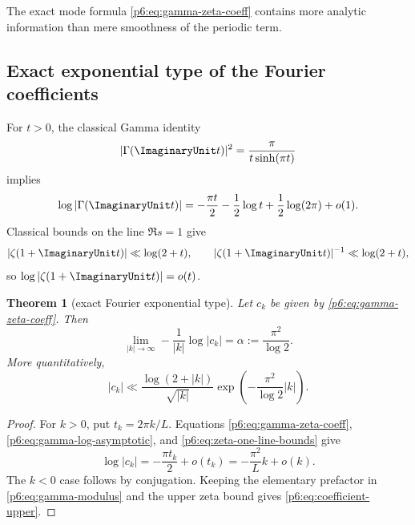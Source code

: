 \documentclass[11pt]{article}
\numberwithin{equation}{section}
\newtheorem{theorem}{Theorem}[section]
\theoremstyle{definition}
\theoremstyle{remark}
\begin{document}
The exact mode formula \eqref{p6:eq:gamma-zeta-coeff} contains more analytic information than
mere smoothness of the periodic term.

\subsection{Exact exponential type of the Fourier coefficients}

For $t>0$, the classical Gamma identity \cite{p6:dlmf}
\begin{equation}
 |\Gamma(\ImaginaryUnit t)|^2=\frac{\pi}{t\sinh(\pi t)}
 \label{p6:eq:gamma-modulus}
\end{equation}
implies
\begin{equation}
 \log|\Gamma(\ImaginaryUnit t)|
 =-\frac{\pi t}{2}-\frac12\log t+\frac12\log(2\pi)+o(1).
 \label{p6:eq:gamma-log-asymptotic}
\end{equation}
Classical bounds on the line $\Re s=1$ \cite{p6:titchmarsh,p6:trudgian2014,p6:trudgian2015} give
\begin{equation}
 |\zeta(1+\ImaginaryUnit t)|\ll\log(2+t),
 \qquad
 |\zeta(1+\ImaginaryUnit t)|^{-1}\ll\log(2+t),
 \label{p6:eq:zeta-one-line-bounds}
\end{equation}
so $\log|\zeta(1+\ImaginaryUnit t)|=o(t)$.

\begin{theorem}[exact Fourier exponential type]
\label{p6:thm:coefficient-type}
Let $c_k$ be given by \eqref{p6:eq:gamma-zeta-coeff}.  Then
\begin{equation}
 \boxed{\displaystyle
 \lim_{|k|\to\infty}-\frac{1}{|k|}\log|c_k|
 =\alpha:=\frac{\pi^2}{\log2}.}
 \label{p6:eq:exact-coefficient-type}
\end{equation}
More quantitatively,
\begin{equation}
 |c_k|
 \ll\frac{\log(2+|k|)}{\sqrt{|k|}}
 \exp\!\left(-\frac{\pi^2}{\log2}|k|\right).
 \label{p6:eq:coefficient-upper}
\end{equation}
\end{theorem}

\begin{proof}
For $k>0$, put $t_k=2\pi k/L$.  Equations
\eqref{p6:eq:gamma-zeta-coeff}, \eqref{p6:eq:gamma-log-asymptotic}, and
\eqref{p6:eq:zeta-one-line-bounds} give
\[
 \log|c_k|=-\frac{\pi t_k}{2}+o(t_k)
 =-\frac{\pi^2}{L}k+o(k).
\]
The $k<0$ case follows by conjugation.  Keeping the elementary prefactor in
\eqref{p6:eq:gamma-modulus} and the upper zeta bound gives
\eqref{p6:eq:coefficient-upper}.
\end{proof}
\end{document}
